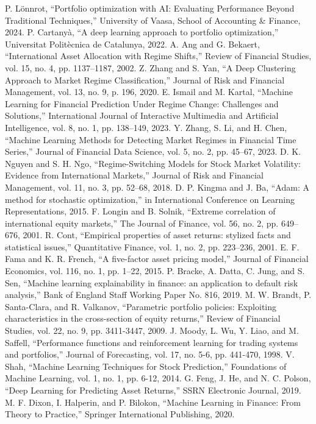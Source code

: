 \documentclass[conference]{IEEEtran}
\begin{document}
\begin{thebibliography}{00}
 P. Lönnrot, ``Portfolio optimization with AI: Evaluating Performance Beyond Traditional Techniques,'' University of Vaasa, School of Accounting \& Finance, 2024.
 P. Cartanyà, ``A deep learning approach to portfolio optimization,'' Universitat Politècnica de Catalunya, 2022.
 A. Ang and G. Bekaert, ``International Asset Allocation with Regime Shifts,'' Review of Financial Studies, vol. 15, no. 4, pp. 1137--1187, 2002.
 Z. Zhang and S. Yan, ``A Deep Clustering Approach to Market Regime Classification,'' Journal of Risk and Financial Management, vol. 13, no. 9, p. 196, 2020.
 E. Ismail and M. Kartal, ``Machine Learning for Financial Prediction Under Regime Change: Challenges and Solutions,'' International Journal of Interactive Multimedia and Artificial Intelligence, vol. 8, no. 1, pp. 138--149, 2023.
 Y. Zhang, S. Li, and H. Chen, ``Machine Learning Methods for Detecting Market Regimes in Financial Time Series,'' Journal of Financial Data Science, vol. 5, no. 2, pp. 45--67, 2023.
 D. K. Nguyen and S. H. Ngo, ``Regime-Switching Models for Stock Market Volatility: Evidence from International Markets,'' Journal of Risk and Financial Management, vol. 11, no. 3, pp. 52--68, 2018.
 D. P. Kingma and J. Ba, ``Adam: A method for stochastic optimization,'' in International Conference on Learning Representations, 2015.
 F. Longin and B. Solnik, ``Extreme correlation of international equity markets,'' The Journal of Finance, vol. 56, no. 2, pp. 649--676, 2001.
 R. Cont, ``Empirical properties of asset returns: stylized facts and statistical issues,'' Quantitative Finance, vol. 1, no. 2, pp. 223--236, 2001.
 E. F. Fama and K. R. French, ``A five-factor asset pricing model,'' Journal of Financial Economics, vol. 116, no. 1, pp. 1--22, 2015.
 P. Bracke, A. Datta, C. Jung, and S. Sen, ``Machine learning explainability in finance: an application to default risk analysis,'' Bank of England Staff Working Paper No. 816, 2019.
 M. W. Brandt, P. Santa-Clara, and R. Valkanov, ``Parametric portfolio policies: Exploiting characteristics in the cross-section of equity returns,'' Review of Financial Studies, vol. 22, no. 9, pp. 3411-3447, 2009.
 J. Moody, L. Wu, Y. Liao, and M. Saffell, ``Performance functions and reinforcement learning for trading systems and portfolios,'' Journal of Forecasting, vol. 17, no. 5-6, pp. 441-470, 1998.
 V. Shah, ``Machine Learning Techniques for Stock Prediction,'' Foundations of Machine Learning, vol. 1, no. 1, pp. 6-12, 2014.
 G. Feng, J. He, and N. C. Polson, ``Deep Learning for Predicting Asset Returns,'' SSRN Electronic Journal, 2019.
 M. F. Dixon, I. Halperin, and P. Bilokon, ``Machine Learning in Finance: From Theory to Practice,'' Springer International Publishing, 2020.
\end{thebibliography}
\end{document}
